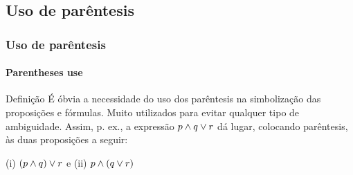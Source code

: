 \subsection{Uso de parêntesis}
%
\begin{frame}[t]
    \frametitle{Uso de parêntesis}
    \framesubtitle{Parentheses use}
    \begin{block}{Definição}
        \indent É óbvia a necessidade do uso dos parêntesis na simbolização das proposições e fórmulas. Muito utilizados para evitar qualquer tipo de ambiguidade. Assim, p. ex., a expressão $p \land q \lor r$ dá lugar, colocando parêntesis, às duas proposições a seguir:
        \begin{center}
            (i) $(p \land q) \lor r$ \quad e \quad (ii) $p \land (q \lor r)$
        \end{center}
    \end{block}
\end{frame}